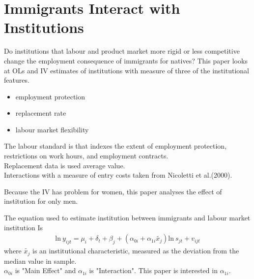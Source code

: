 \documentclass[../root]{subfiles}
\begin{document}
    \section{Immigrants Interact with Institutions}
    Do institutions that labour and product market more rigid or less competitive change the employment consequence of immigrants for natives? 
    This paper looks at OLs and IV estimates of institutions with measure of three of the institutional features.
    
    \begin{itemize}
        \item employment protection
        \item replacement rate 
        \item labour market flexibility
    \end{itemize}
    The labour standard is that indexes the extent of employment protection, restrictions on work hours, and employment contracts. \\
    Replacement data is used average value. \\
    Interactions with a measure of entry costs taken from Nicoletti et al.(2000).
    
    Because the IV has problem for women, this paper analyses the effect of institution for only men.
    
    The equation used to estimate institution between immigrants and labour market institution Is
    \begin{align}
        \mbox{ln} \ y_{ijt} = \mu_i+\delta_t+\beta_j+(\alpha_{0i}+\alpha_{1i} \tilde{x_j})\mbox{ln} \ s_{jt} +v_{ijt}
    \end{align}
    where $\tilde{x_j}$ is an institutional characteristic, measured as the deviation from the median value in sample. \\
    $\alpha_{0i}$ is "Main Effect" and $\alpha_{1i}$ is "Interaction". This paper is interested in $\alpha_{1i}$.
   
\end{document}
